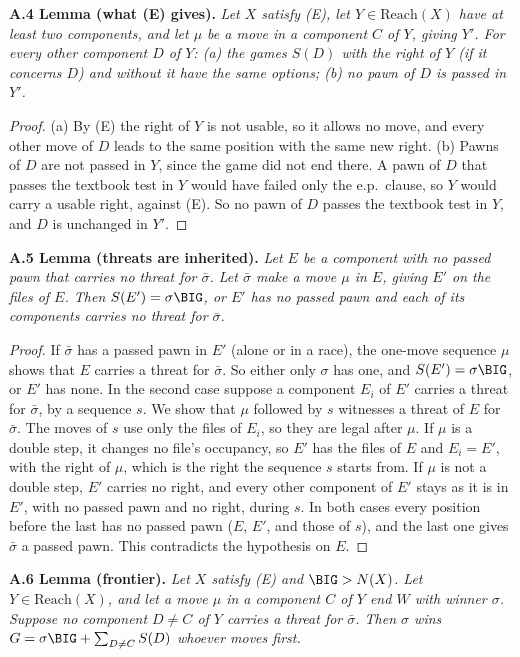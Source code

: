 \textbf{A.4 Lemma (what (E) gives).} \emph{Let $X$ satisfy (E), let $Y\in\mathrm{Reach}(X)$ have at least two components,
and let $\mu$ be a move in a component $C$ of $Y$, giving $Y'$. For every other component $D$ of $Y$: (a) the games
$S(D)$ with the right of $Y$ (if it concerns $D$) and without it have the same options; (b) no pawn of $D$ is passed in
$Y'$.}

\begin{proof}
(a) By (E) the right of $Y$ is not usable, so it allows no move, and every other move of $D$ leads to the same position
with the same new right. (b) Pawns of $D$ are not passed in $Y$, since the game did not end there. A pawn of $D$ that
passes the textbook test in $Y$ would have failed only the e.p.\ clause, so $Y$ would carry a usable right, against (E). So
no pawn of $D$ passes the textbook test in $Y$, and $D$ is unchanged in $Y'$.
\end{proof}

\textbf{A.5 Lemma (threats are inherited).} \emph{Let $E$ be a component with no passed pawn that carries no threat for
$\bar\sigma$. Let $\bar\sigma$ make a move $\mu$ in $E$, giving $E'$ on the files of $E$. Then $S(E')=\sigma\BIG$, or $E'$ has no passed pawn and each of its components carries no threat for
$\bar\sigma$.}

\begin{proof}
If $\bar\sigma$ has a passed pawn in $E'$ (alone or in a race), the one-move sequence $\mu$ shows that $E$ carries a
threat for $\bar\sigma$. So either only $\sigma$ has one, and $S(E')=\sigma\BIG$, or $E'$ has none. In the second case
suppose a component $E_i$ of $E'$ carries a threat for $\bar\sigma$, by a sequence $s$. We show that $\mu$ followed by $s$
witnesses a threat of $E$ for $\bar\sigma$. The moves of $s$ use only the files of $E_i$, so they are legal after $\mu$. If
$\mu$ is a double step, it changes no file's occupancy, so $E'$ has the files of $E$ and $E_i=E'$, with the right of $\mu$,
which is the right the sequence $s$ starts from. If $\mu$ is not a double step, $E'$ carries no right, and every other
component of $E'$ stays as it is in $E'$, with no passed pawn and no right, during $s$. In both cases every position before
the last has no passed pawn ($E$, $E'$, and those of $s$), and the last one gives $\bar\sigma$ a passed pawn. This
contradicts the hypothesis on $E$.
\end{proof}

\textbf{A.6 Lemma (frontier).} \emph{Let $X$ satisfy (E) and $\BIG>N(X)$. Let $Y\in\mathrm{Reach}(X)$, and let a move
$\mu$ in a component $C$ of $Y$ end $W$ with winner $\sigma$. Suppose no component $D\ne C$ of $Y$ carries a threat for
$\bar\sigma$. Then $\sigma$ wins $G=\sigma\BIG+\sum_{D\ne C}S(D)$ whoever moves first.}

